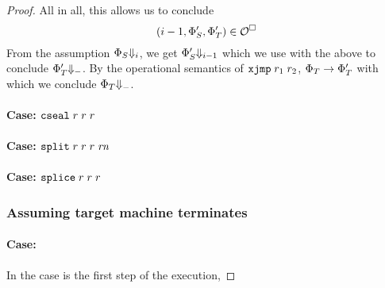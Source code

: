 \documentclass[a4paper]{article}
\begin{document}
\begin{proof}
All in all, this allows us to conclude
\[
  \npair[i-1]{\Phi_S',\Phi_T'} \in \lro
\]
From the assumption $\Phi_S\term[i]$, we get $\Phi'_S\term[i-1]$ which we use with the above to conclude $\Phi_T' \term$. By the operational semantics of $\txjmp{r_1}{r_2}$, $\Phi_T \step \Phi_T'$ with which we conclude $\Phi_T \term$.


\paragraph{Case: $\protect\tcseal{\trg{r}}{\trg{r}}{\trg{r}}$}

\paragraph{Case: $\protect\tsplit{\trg{r}}{\trg{r}}{\trg{r}}{\trg{\rn}}$}

\paragraph{Case: $\protect\tsplice{\trg{r}}{\trg{r}}{\trg{r}}$}

\subsubsection*{Assuming target machine terminates}
\paragraph{Case: }
In the case  is the first step of the execution,


\end{proof}
\end{document}
